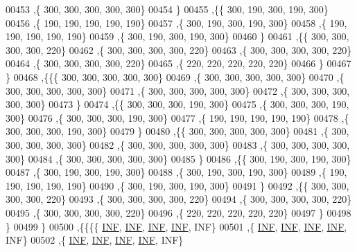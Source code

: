 \begin{DoxyCode}
00453    ,\{   300,   300,   300,   300,   300\}
00454    \}
00455   ,\{\{   300,   190,   300,   190,   300\}
00456    ,\{   190,   190,   190,   190,   190\}
00457    ,\{   300,   190,   300,   190,   300\}
00458    ,\{   190,   190,   190,   190,   190\}
00459    ,\{   300,   190,   300,   190,   300\}
00460    \}
00461   ,\{\{   300,   300,   300,   300,   220\}
00462    ,\{   300,   300,   300,   300,   220\}
00463    ,\{   300,   300,   300,   300,   220\}
00464    ,\{   300,   300,   300,   300,   220\}
00465    ,\{   220,   220,   220,   220,   220\}
00466    \}
00467   \}
00468  ,\{\{\{   300,   300,   300,   300,   300\}
00469    ,\{   300,   300,   300,   300,   300\}
00470    ,\{   300,   300,   300,   300,   300\}
00471    ,\{   300,   300,   300,   300,   300\}
00472    ,\{   300,   300,   300,   300,   300\}
00473    \}
00474   ,\{\{   300,   300,   300,   190,   300\}
00475    ,\{   300,   300,   300,   190,   300\}
00476    ,\{   300,   300,   300,   190,   300\}
00477    ,\{   190,   190,   190,   190,   190\}
00478    ,\{   300,   300,   300,   190,   300\}
00479    \}
00480   ,\{\{   300,   300,   300,   300,   300\}
00481    ,\{   300,   300,   300,   300,   300\}
00482    ,\{   300,   300,   300,   300,   300\}
00483    ,\{   300,   300,   300,   300,   300\}
00484    ,\{   300,   300,   300,   300,   300\}
00485    \}
00486   ,\{\{   300,   190,   300,   190,   300\}
00487    ,\{   300,   190,   300,   190,   300\}
00488    ,\{   300,   190,   300,   190,   300\}
00489    ,\{   190,   190,   190,   190,   190\}
00490    ,\{   300,   190,   300,   190,   300\}
00491    \}
00492   ,\{\{   300,   300,   300,   300,   220\}
00493    ,\{   300,   300,   300,   300,   220\}
00494    ,\{   300,   300,   300,   300,   220\}
00495    ,\{   300,   300,   300,   300,   220\}
00496    ,\{   220,   220,   220,   220,   220\}
00497    \}
00498   \}
00499  \}
00500 ,\{\{\{\{   \hyperlink{constants_8h_a12c2040f25d8e3a7b9e1c2024c618cb6}{INF},   \hyperlink{constants_8h_a12c2040f25d8e3a7b9e1c2024c618cb6}{INF},   \hyperlink{constants_8h_a12c2040f25d8e3a7b9e1c2024c618cb6}{INF},   \hyperlink{constants_8h_a12c2040f25d8e3a7b9e1c2024c618cb6}{INF},   INF\}
00501    ,\{   \hyperlink{constants_8h_a12c2040f25d8e3a7b9e1c2024c618cb6}{INF},   \hyperlink{constants_8h_a12c2040f25d8e3a7b9e1c2024c618cb6}{INF},   \hyperlink{constants_8h_a12c2040f25d8e3a7b9e1c2024c618cb6}{INF},   \hyperlink{constants_8h_a12c2040f25d8e3a7b9e1c2024c618cb6}{INF},   INF\}
00502    ,\{   \hyperlink{constants_8h_a12c2040f25d8e3a7b9e1c2024c618cb6}{INF},   \hyperlink{constants_8h_a12c2040f25d8e3a7b9e1c2024c618cb6}{INF},   \hyperlink{constants_8h_a12c2040f25d8e3a7b9e1c2024c618cb6}{INF},   \hyperlink{constants_8h_a12c2040f25d8e3a7b9e1c2024c618cb6}{INF},   INF\}

\end{DoxyCode}
